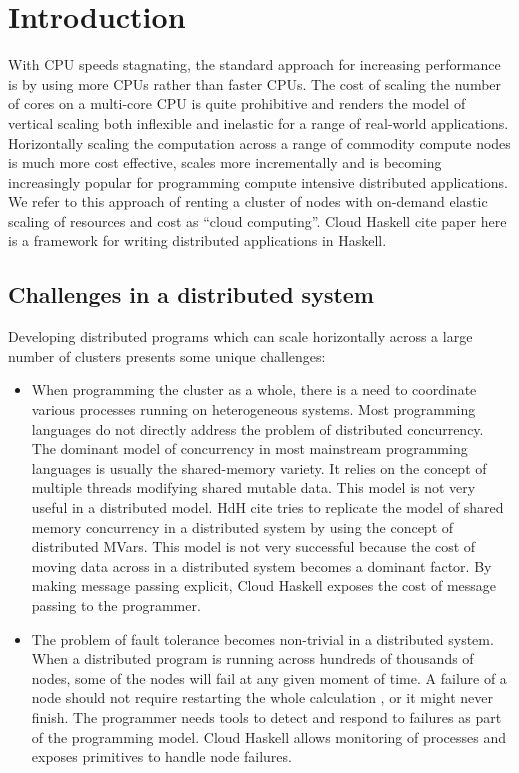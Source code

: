 \chapter{Introduction}
\label{chap:intro}

With CPU speeds stagnating, the standard approach for increasing performance
is by using more CPUs rather than faster CPUs.  The cost of scaling
the number of cores on a multi-core CPU is quite prohibitive and
renders the model of vertical scaling both inflexible and inelastic
for a range of real-world applications. Horizontally scaling the
computation across a range of commodity compute nodes is much more
cost effective, scales more incrementally and is becoming increasingly
popular for programming compute intensive distributed applications. We
refer to this approach of renting a cluster of nodes with on-demand
elastic scaling of resources and cost as ``cloud computing''. Cloud
Haskell {cite paper here} is a framework for writing distributed applications in
Haskell.

\section{Challenges in a distributed system}

Developing distributed programs which can scale horizontally across a
large number of clusters presents some unique challenges:

\begin{itemize}
\item When programming the cluster as a whole, there is a need to
  coordinate various processes running on heterogeneous systems. Most
  programming languages do not directly address the problem of
  distributed concurrency. The dominant model of concurrency in most
  mainstream programming languages is usually the shared-memory
  variety. It relies on the concept of multiple threads modifying
  shared mutable data. This model is not very useful in a distributed
  model. HdH {cite} tries to replicate the model of shared memory concurrency
  in a distributed system by using the concept of distributed
  MVars. This model is not very successful because the cost of moving
  data across in a distributed system becomes a dominant factor. By
  making message passing explicit, Cloud Haskell exposes the cost of
  message passing to the programmer.
\item The problem of fault tolerance becomes non-trivial in a
  distributed system. When a distributed program is running across
  hundreds of thousands of nodes, some of the nodes will fail at any
  given moment of time. A failure of a node should not require
  restarting the whole calculation , or it might never finish. The
  programmer needs tools to detect and respond to failures as part of
  the programming model. Cloud Haskell allows monitoring of processes
  and exposes primitives to handle node failures.
\end{itemize}

